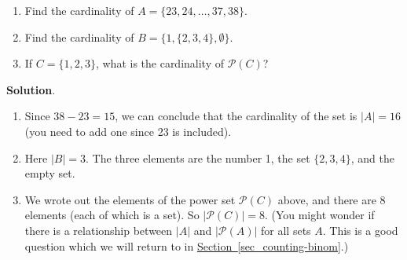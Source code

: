 \documentclass[11pt,]{book}
\theoremstyle{ptxplainnotitle}
\theoremstyle{ptxplaintitle}
\theoremstyle{ptxdefinitionnotitle}
\theoremstyle{ptxdefinitiontitle}
\theoremstyle{ptxdefinitionnotitle}
\theoremstyle{ptxdefinitiontitle}
\theoremstyle{ptxdefinitionnotitle}
\theoremstyle{ptxdefinitiontitle}
\theoremstyle{ptxdefinitiontitlenonumber}
\theoremstyle{ptxdefinitiontitlenonumber}
\numberwithin{equation}{chapter}
\newcommand{\pow}{\mathcal P}
\newcommand{\card}[1]{\left| #1 \right|}
\begin{document}
\begin{example}\label{example-31}
\hypertarget{p-728}{}%
\leavevmode%
\begin{enumerate}
\item\hypertarget{li-306}{}\hypertarget{p-729}{}%
Find the cardinality of \(A = \{23, 24, \ldots, 37, 38\}\).%
\item\hypertarget{li-307}{}\hypertarget{p-730}{}%
Find the cardinality of \(B = \{1, \{2, 3, 4\}, \emptyset\}\).%
\item\hypertarget{li-308}{}\hypertarget{p-731}{}%
If \(C = \{1,2,3\}\), what is the cardinality of \(\pow(C)\)?%
\end{enumerate}
%
\par\smallskip%
\noindent\textbf{Solution}.\hypertarget{solution-97}{}\quad%
\hypertarget{p-732}{}%
\leavevmode%
\begin{enumerate}
\item\hypertarget{li-309}{}\hypertarget{p-733}{}%
Since \(38 - 23 = 15\), we can conclude that the cardinality of the set is \(|A| = 16\) (you need to add one since 23 is included).%
\item\hypertarget{li-310}{}\hypertarget{p-734}{}%
Here \(|B| = 3\). The three elements are the number 1, the set \(\{2,3,4\}\), and the empty set.%
\item\hypertarget{li-311}{}\hypertarget{p-735}{}%
We wrote out the elements of the power set \(\pow(C)\) above, and there are 8 elements (each of which is a set). So \(\card{\pow(C)} = 8\).  (You might wonder if there is a relationship between \(\card{A}\) and \(\card{\pow(A)}\) for all sets \(A\).  This is a good question which we will return to in \hyperref[sec_counting-binom]{Section~\ref{sec_counting-binom}}.)%
\end{enumerate}
%
\end{example}
\typeout{************************************************}
\typeout{************************************************}
\end{document}
